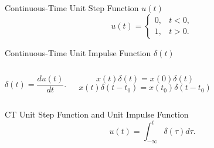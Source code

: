\begin{frame}[plain]{Continuous-Time Unit Step Function $u(t)$}
    \begin{equation}
        u(t) = \begin{cases}
                 0, & t < 0,\\
                 1, & t>0.
               \end{cases}
    \end{equation}
    {
        {
            \centering
            
        }
    }
\end{frame}



\begin{frame}[plain]{Continuous-Time Unit Impulse Function $\delta(t)$}
    \begin{columns}[t]
        {
            {
                {
                    \centering
                    
                }
            }
        }
        \pause
        {
            \begin{equation}
                \delta(t) = \frac{du(t)}{dt}.
            \end{equation}
            {
                {
                    \centering
                    
                }
                \pause
                \begin{equation*}
                    x(t)\delta(t) = x(0)\delta(t)
                \end{equation*}
                \begin{equation*}
                    x(t)\delta(t -t_0) = x(t_0)\delta(t-t_0)
                \end{equation*}
                
            }
        }
    \end{columns}




\end{frame}

\begin{frame}[plain]{CT Unit Step Function and Unit Impulse Function}
    \begin{equation}
        u(t) = \int_{-\infty}^{t}\delta(\tau)d\tau.
    \end{equation}
        {
            {
                \centering
                
            }
        }
\end{frame}



